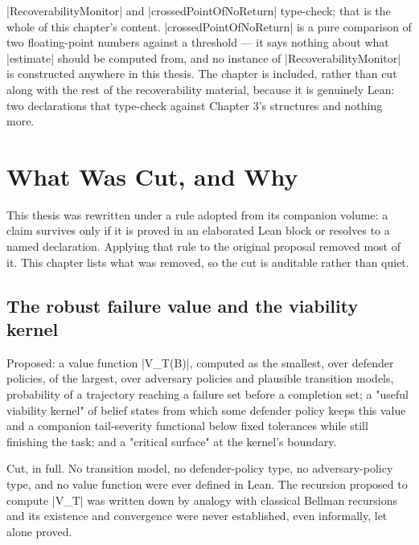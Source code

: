 \documentclass{memoir}
\begin{document}
\LeanVerb|RecoverabilityMonitor| and \LeanVerb|crossedPointOfNoReturn| type-check; that is the
whole of this chapter's content. \LeanVerb|crossedPointOfNoReturn| is a pure
comparison of two floating-point numbers against a threshold — it says
nothing about what \LeanVerb|estimate| should be computed from, and no instance of
\LeanVerb|RecoverabilityMonitor| is constructed anywhere in this thesis. The chapter
is included, rather than cut along with the rest of the recoverability
material, because it is genuinely Lean: two declarations that type-check
against Chapter 3's structures and nothing more.





\chapter{What Was Cut, and Why}\label{Capability--Monotonicity--in--a--Formal--Skeleton--for--Agentic--AI--Safety----What--Was--Cut-005F-005F-005F--and--Why}

This thesis was rewritten under a rule adopted from its companion volume:
a claim survives only if it is proved in an elaborated Lean block or
resolves to a named declaration. Applying that rule to the original
proposal removed most of it. This chapter lists what was removed, so the
cut is auditable rather than quiet.



\section{The robust failure value and the viability kernel}\label{Capability--Monotonicity--in--a--Formal--Skeleton--for--Agentic--AI--Safety----What--Was--Cut-005F-005F-005F--and--Why----The--robust--failure--value--and--the--viability--kernel}

Proposed: a value function \LeanVerb|V_T(B)|, computed as the smallest,
over defender policies, of the largest, over adversary policies and
plausible transition models, probability of a trajectory reaching a
failure set before a completion set; a "useful viability kernel" of belief
states from which some defender policy keeps this value and a companion
tail-severity functional below fixed tolerances while still finishing the
task; and a "critical surface" at the kernel's boundary.

Cut, in full. No transition model, no defender-policy type, no
adversary-policy type, and no value function were ever defined in Lean.
The recursion proposed to compute \LeanVerb|V_T| was written down by analogy with
classical Bellman recursions and its existence and convergence were never
established, even informally, let alone proved.
\end{document}
